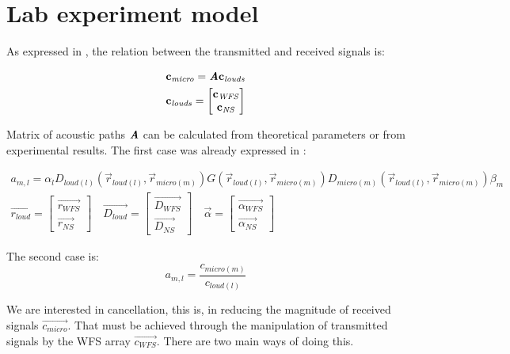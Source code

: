 \section{Lab experiment model}
As expressed in , the relation between the transmitted and received signals is:

\begin{gather}
\mathbf{c_\mathit{micro}} = \bm{\mathit{A}} \mathbf{c_\mathit{louds}} \\
\mathbf{c_\mathit{louds}} = 
\begin{bmatrix}
	\mathbf{c_\mathit{WFS}} \\
	\mathbf{c_\mathit{NS}}
\end{bmatrix}
\label{transEqMatrixRep1}
\end{gather}

Matrix of acoustic paths $\bm{\mathit{A}}$ can be calculated from theoretical parameters or from experimental results. The first case was already expressed in :

\begin{gather}
a_{m,l} = \alpha_l D_{loud (l)}(\vec{r}_{loud (l)}, \vec{r}_{micro (m)}) G(\vec{r}_{loud (l)}, \vec{r}_{micro (m)}) D_{micro (m)}(\vec{r}_{loud (l)}, \vec{r}_{micro (m)}) \beta_m 
\label{acPathTheoricRep1} \\
\vec{r_\mathit{loud}} =
\begin{bmatrix}
	\vec{r_\mathit{WFS}} \\
	\vec{r_\mathit{NS}}
\end{bmatrix}
\quad
\vec{D_\mathit{loud}} =
\begin{bmatrix}
	\vec{D_\mathit{WFS}} \\
	\vec{D_\mathit{NS}}
\end{bmatrix} 
\quad
\vec{\alpha} =
\begin{bmatrix}
	\vec{\alpha_\mathit{WFS}} \\
	\vec{\alpha_\mathit{NS}}
\end{bmatrix}
\label{WFSandNSconcatenation}
\end{gather}

The second case is:
\begin{equation}
a_{m, l} = \frac{c_{\mathit{micro} (m)}}{c_{\mathit{loud} (l)}}
\end{equation}

We are interested in cancellation, this is, in reducing the magnitude of received signals $\vec{c_\mathit{micro}}$. That must be achieved through the manipulation of transmitted signals by the WFS array $\vec{c_\mathit{WFS}}$. There are two main ways of doing this.


